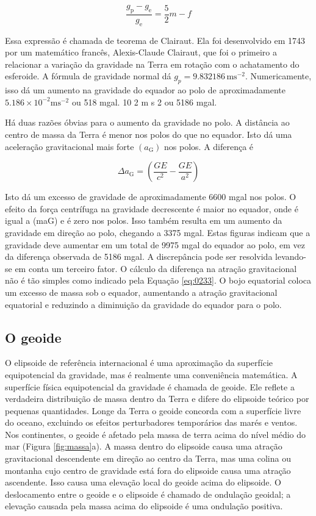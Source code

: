 \documentclass[]{book}
\theoremstyle{definition}
\theoremstyle{definition}
\theoremstyle{definition}
\theoremstyle{remark}
\begin{document}
\begin{equation}
\frac{g_{\mathrm{p}}-g_{\mathrm{e}}}{g_{\mathrm{e}}}=\frac{5}{2} m-f
\label{eq:0232}
\end{equation}

Essa expressão é chamada de teorema de Clairaut. Ela foi desenvolvido em 1743 por um matemático francês, Alexis-Claude Clairaut, que foi o primeiro a relacionar a variação da gravidade na Terra em rotação com o achatamento do esferoide. A fórmula de gravidade normal dá \(g_p=9.832186\,\text{m}\text{s}^{-2}\). Numericamente, isso dá um aumento na gravidade do equador ao polo de aproximadamente \(5.186 \times 10^{-2} \mathrm{m} \mathrm{s}^{-2}\) ou 518 mgal.
10 2 m s 2 ou 5186 mgal.

Há duas razões óbvias para o aumento da gravidade no polo. A distância ao centro de massa da Terra é menor nos polos do que no equador. Isto dá uma aceleração gravitacional mais forte \((a_\mathrm{G})\) nos polos. A diferença é

\begin{equation}
\Delta a_{\mathrm{G}}=\left(\frac{G E}{c^{2}}-\frac{G E}{a^{2}}\right) \label{eq:0233}
\end{equation}

Isto dá um excesso de gravidade de aproximadamente 6600 mgal nos polos. O efeito da força centrífuga na gravidade decrescente é maior no equador, onde é igual a (maG) e é zero nos polos. Isso também resulta em um aumento da gravidade em direção ao polo, chegando a 3375 mgal. Estas figuras indicam que a gravidade deve aumentar em um total de 9975 mgal do equador ao polo, em vez da diferença observada de 5186 mgal. A discrepância pode ser resolvida levando-se em conta um terceiro fator. O cálculo da diferença na atração gravitacional não é tão simples como indicado pela Equação \eqref{eq:0233}. O bojo equatorial coloca um excesso de massa sob o equador, aumentando a atração gravitacional equatorial e reduzindo a diminuição da gravidade do equador para o polo.

\hypertarget{o-geoide}{%
\subsection{O geoide}\label{o-geoide}}

O elipsoide de referência internacional é uma aproximação da superfície equipotencial da gravidade, mas é realmente uma conveniência matemática. A superfície física equipotencial da gravidade é chamada de geoide. Ele reflete a verdadeira distribuição de massa dentro da Terra e difere do elipsoide teórico por pequenas quantidades. Longe da Terra o geoide concorda com a superfície livre do oceano, excluindo os efeitos perturbadores temporários das marés e ventos. Nos continentes, o geoide é afetado pela massa de terra acima do nível médio do mar (Figura \ref{fig:massa}a). A massa dentro do elipsoide causa uma atração gravitacional descendente em direção ao centro da Terra, mas uma colina ou montanha cujo centro de gravidade está fora do elipsoide causa uma atração ascendente. Isso causa uma elevação local do geoide acima do elipsoide. O deslocamento entre o geoide e o elipsoide é chamado de ondulação geoidal; a elevação causada pela massa acima do elipsoide é uma ondulação positiva.
\end{document}
